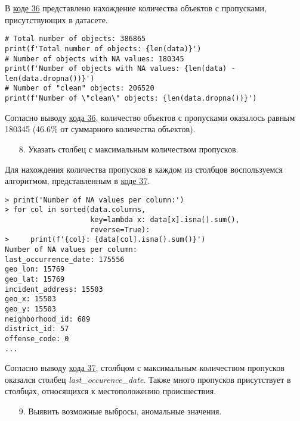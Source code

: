 В \hyperref[code:36]{коде 36} представлено нахождение количества объектов с пропусками, присутствующих в датасете.

\begin{code}
\begin{verbatim}
# Total number of objects: 386865
print(f'Total number of objects: {len(data)}')
# Number of objects with NA values: 180345
print(f'Number of objects with NA values: {len(data) - len(data.dropna())}')
# Number of "clean" objects: 206520
print(f'Number of \"clean\" objects: {len(data.dropna())}')
\end{verbatim}
\label{code:36}
\end{code}

Согласно выводу \hyperref[code:36]{кода 36}, количество объектов с пропусками оказалось равным 180345 (46.6\% от суммарного количества объектов).

\begin{enumerate}
    \item[8.] Указать столбец с максимальным количеством пропусков.
\end{enumerate}

Для нахождения количества пропусков в каждом из столбцов воспользуемся алгоритмом, представленным в \hyperref[code:37]{коде 37}.

\begin{code}
\begin{verbatim}
> print('Number of NA values per column:')
> for col in sorted(data.columns, 
                    key=lambda x: data[x].isna().sum(), 
                    reverse=True):
>     print(f'{col}: {data[col].isna().sum()}')
Number of NA values per column:
last_occurrence_date: 175556
geo_lon: 15769
geo_lat: 15769
incident_address: 15503
geo_x: 15503
geo_y: 15503
neighborhood_id: 689
district_id: 57
offense_code: 0
...
\end{verbatim}
\label{code:37}
\end{code}

Согласно выводу \hyperref[code:37]{кода 37}, столбцом с максимальным количеством пропусков оказался столбец \textit{last\_occurence\_date}.
Также много пропусков присутствует в столбцах, относящихся к местоположению происшествия.

\begin{enumerate}
    \item[9.] Выявить возможные выбросы, аномальные значения.
\end{enumerate}

